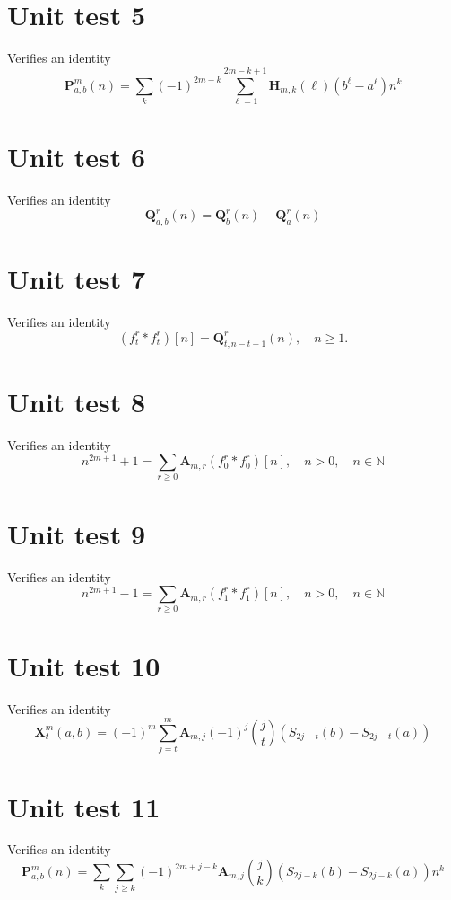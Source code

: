 \documentclass[12pt, letterpaper]{amsart}
\theoremstyle{definition}
\theoremstyle{remark}
\numberwithin{equation}{section}
\begin{document}
\section{Unit test 5}
Verifies an identity
\begin{equation*}
\mathbf{P}^{m}_{a,b}(n) = \sum_{k} (-1)^{2m-k} \sum_{\ell=1}^{2m-k+1} \mathbf{H}_{m,k}(\ell)(b^\ell - a^\ell)n^k
\end{equation*}
\section{Unit test 6}
Verifies an identity
\begin{equation*}
\mathbf{Q}^{r}_{a,b}(n) = \mathbf{Q}^{r}_{b}(n) - \mathbf{Q}^{r}_{a}(n)
\end{equation*}
\section{Unit test 7}
Verifies an identity
\begin{equation*}
(f_{t}^{r} \ast f_{t}^{r})[n]  = \mathbf{Q}_{t,n-t+1}^r(n), \quad n\geq 1.
\end{equation*}
\section{Unit test 8}
Verifies an identity
\begin{equation*}
n^{2m+1} + 1 = \sum_{r\geq 0} \mathbf{A}_{m,r} (f_{0}^{r} \ast f_{0}^{r})[n], \quad n>0, \quad n\in\mathbb{N}
\end{equation*}
\section{Unit test 9}
Verifies an identity
\begin{equation*}
n^{2m+1} - 1 = \sum_{r\geq 0} \mathbf{A}_{m,r} (f_{1}^{r} \ast f_{1}^{r})[n], \quad n>0, \quad n\in\mathbb{N}
\end{equation*}
\section{Unit test 10}
Verifies an identity
\begin{equation*}
\mathbf{X}^{m}_{t}(a,b) = (-1)^m \sum_{j=t}^m \mathbf{A}_{m,j} (-1)^j \binom{j}{t} (S_{2j-t} (b) - S_{2j-t} (a))
\end{equation*}
\section{Unit test 11}
Verifies an identity
\begin{equation*}
\mathbf{P}^{m}_{a,b}(n) = \sum_{k} \sum\limits_{j\geq k}(-1)^{2m+j-k} \mathbf{A}_{m,j} \binom{j}{k}(S_{2j-k}(b)-S_{2j-k}(a)) n^k 
\end{equation*}
\end{document}

